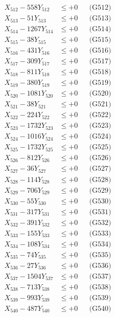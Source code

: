 \documentclass[a4paper,10pt]{article}
\begin{document}
{\begin{align}
X_{512} - 558Y_{512} &\leq +0 && \text{(G512)} \\
X_{513} - 51Y_{513} &\leq +0 && \text{(G513)} \\
X_{514} - 1267Y_{514} &\leq +0 && \text{(G514)} \\
X_{515} - 38Y_{515} &\leq +0 && \text{(G515)} \\
X_{516} - 431Y_{516} &\leq +0 && \text{(G516)} \\
X_{517} - 309Y_{517} &\leq +0 && \text{(G517)} \\
X_{518} - 811Y_{518} &\leq +0 && \text{(G518)} \\
X_{519} - 380Y_{519} &\leq +0 && \text{(G519)} \\
X_{520} - 1081Y_{520} &\leq +0 && \text{(G520)} \\
\allowbreak
X_{521} - 38Y_{521} &\leq +0 && \text{(G521)} \\
X_{522} - 224Y_{522} &\leq +0 && \text{(G522)} \\
X_{523} - 1732Y_{523} &\leq +0 && \text{(G523)} \\
X_{524} - 1016Y_{524} &\leq +0 && \text{(G524)} \\
X_{525} - 1732Y_{525} &\leq +0 && \text{(G525)} \\
X_{526} - 812Y_{526} &\leq +0 && \text{(G526)} \\
X_{527} - 36Y_{527} &\leq +0 && \text{(G527)} \\
X_{528} - 114Y_{528} &\leq +0 && \text{(G528)} \\
X_{529} - 706Y_{529} &\leq +0 && \text{(G529)} \\
X_{530} - 55Y_{530} &\leq +0 && \text{(G530)} \\
\allowbreak
X_{531} - 317Y_{531} &\leq +0 && \text{(G531)} \\
X_{532} - 391Y_{532} &\leq +0 && \text{(G532)} \\
X_{533} - 155Y_{533} &\leq +0 && \text{(G533)} \\
X_{534} - 108Y_{534} &\leq +0 && \text{(G534)} \\
X_{535} - 74Y_{535} &\leq +0 && \text{(G535)} \\
X_{536} - 27Y_{536} &\leq +0 && \text{(G536)} \\
X_{537} - 1504Y_{537} &\leq +0 && \text{(G537)} \\
X_{538} - 713Y_{538} &\leq +0 && \text{(G538)} \\
X_{539} - 993Y_{539} &\leq +0 && \text{(G539)} \\
X_{540} - 487Y_{540} &\leq +0 && \text{(G540)} \\

\end{align}}
\end{document}
